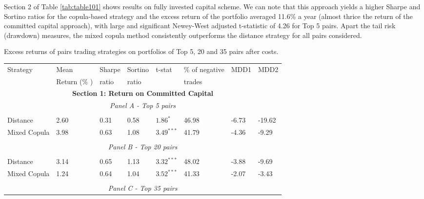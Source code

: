 \documentclass[a4paper]{article}
\begin{document}
Section 2 of Table \ref{tab:table101} shows results on fully invested capital scheme. We can note that this approach yields a higher Sharpe and Sortino ratios for the copula-based strategy and the excess return of the portfolio averaged 11.6\% a year (almost thrice the return of the committed capital approach), with large and significant Newey-West adjusted t-statistic of 4.26 for Top 5 pairs. Apart the tail risk (drawdown) measures, the mixed copula method consistently outperforms the distance strategy for all pairs considered.

\begin{threeparttable}[H]
	\centering \tiny
	\caption{Excess returns of pairs trading strategies on portfolios of Top 5, 20 and 35 pairs after costs.}
	\begin{tabularx}{\textwidth}{@{\extracolsep{\fill}}llllllll@{}}
		\toprule
		Strategy & Mean  & Sharpe & Sortino & t-stat & \% of negative   & MDD1 & MDD2 \\
		& Return (\% ) & ratio &  ratio     &  &  trades     &       &  \\
		\midrule
		\multicolumn{8}{c}{\textbf{Section 1: Return on Committed Capital}} \\
		\multicolumn{8}{c}{\textit{Panel A - Top 5 pairs}} \\
		&       &       &       &       &       &       &  \\
		Distance & 2.60  & 0.31  & 0.58  & $1.86^{*}$  & 46.98 & -6.73    & -19.62 \\
		Mixed Copula &  3.98  &  0.63  & 1.08  &  $3.49^{***}$  &  41.79 &  -4.36  &  -9.29 \\
		\multicolumn{1}{r}{} & \multicolumn{1}{r}{} & \multicolumn{1}{r}{} & \multicolumn{1}{r}{} & \multicolumn{1}{r}{} & \multicolumn{1}{r}{} & \multicolumn{1}{r}{} & \multicolumn{1}{r}{} \\
		\multicolumn{8}{c}{\textit{Panel B - Top 20 pairs}} \\
		&       &       &       &       &       &       &  \\
		Distance &  3.14  &  0.65  & 1.13  & $3.32^{***}$  & 48.02 & -3.88  & -9.69 \\
		Mixed Copula  & 1.24  & 0.64  & 1.04  & $3.52^{***}$  & 41.33 &  -2.07  &  -3.43  \\
		\multicolumn{1}{r}{} & \multicolumn{1}{r}{} & \multicolumn{1}{r}{} & \multicolumn{1}{r}{} & \multicolumn{1}{r}{} & \multicolumn{1}{r}{} & \multicolumn{1}{r}{} & \multicolumn{1}{r}{} \\
		\multicolumn{8}{c}{\textit{Panel C - Top 35 pairs}} \\

\end{tabularx}
\end{threeparttable}
\end{document}
